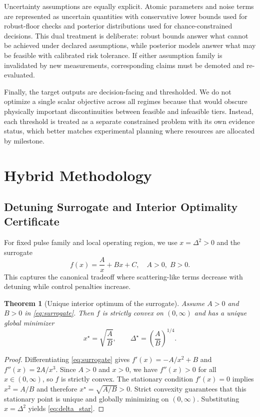 \documentclass{article} %
\newtheorem{theorem}{Theorem}[section]
\begin{document}
Uncertainty assumptions are equally explicit. Atomic parameters and noise terms are represented as uncertain quantities with conservative lower bounds used for robust-floor checks and posterior distributions used for chance-constrained decisions. This dual treatment is deliberate: robust bounds answer what cannot be achieved under declared assumptions, while posterior models answer what may be feasible with calibrated risk tolerance. If either assumption family is invalidated by new measurements, corresponding claims must be demoted and re-evaluated.

Finally, the target outputs are decision-facing and thresholded. We do not optimize a single scalar objective across all regimes because that would obscure physically important discontinuities between feasible and infeasible tiers. Instead, each threshold is treated as a separate constrained problem with its own evidence status, which better matches experimental planning where resources are allocated by milestone.

\section{Hybrid Methodology}
\label{sec:methods}
\subsection{Detuning Surrogate and Interior Optimality Certificate}
For fixed pulse family and local operating region, we use $x=\Delta^2>0$ and the surrogate
\begin{equation}
f(x)=\frac{A}{x}+Bx+C, \quad A>0,\;B>0.
\label{eq:surrogate}
\end{equation}
This captures the canonical tradeoff where scattering-like terms decrease with detuning while control penalties increase.

\begin{theorem}[Unique interior optimum of the surrogate]
\label{thm:fc1}
Assume $A>0$ and $B>0$ in \eqref{eq:surrogate}. Then $f$ is strictly convex on $(0,\infty)$ and has a unique global minimizer
\begin{equation}
x^{\star}=\sqrt{\frac{A}{B}},\qquad
\Delta^{\star}=\left(\frac{A}{B}\right)^{1/4}.
\label{eq:delta_star}
\end{equation}
\end{theorem}

\begin{proof}
Differentiating \eqref{eq:surrogate} gives $f'(x)=-A/x^2+B$ and $f''(x)=2A/x^3$. Since $A>0$ and $x>0$, we have $f''(x)>0$ for all $x\in(0,\infty)$, so $f$ is strictly convex. The stationary condition $f'(x)=0$ implies $x^2=A/B$ and therefore $x^{\star}=\sqrt{A/B}>0$. Strict convexity guarantees that this stationary point is unique and globally minimizing on $(0,\infty)$. Substituting $x=\Delta^2$ yields \eqref{eq:delta_star}.\qedhere
\end{proof}
\end{document}

